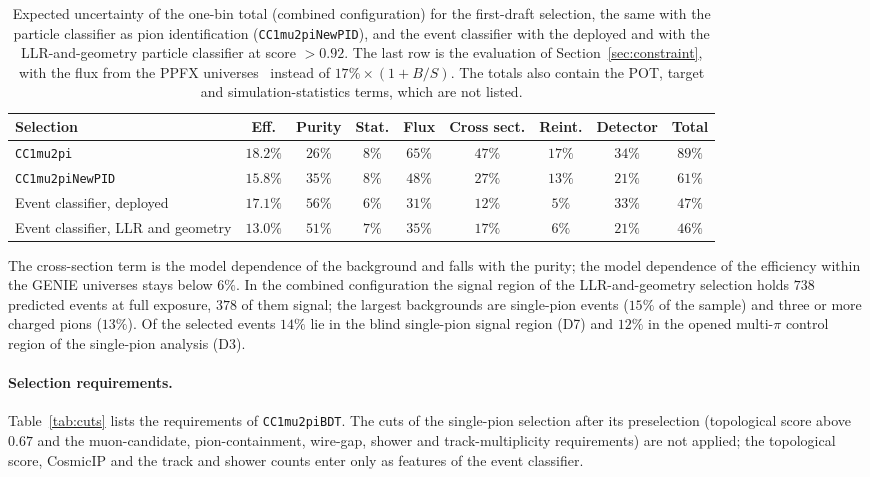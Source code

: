 \documentclass[11pt,a4paper]{article}
\begin{document}
\begin{table}[H]
  \centering
  \caption{Expected uncertainty of the one-bin total (combined configuration) for the first-draft
    selection, the same with the particle classifier as pion identification
    (\texttt{CC1mu2piNewPID}), and the event classifier with the deployed and with the
    LLR-and-geometry particle classifier at score $>0.92$. The last row is the evaluation of
    Section~\ref{sec:constraint}, with the flux from the PPFX universes~\cite{ppfx} instead of
    $17\%\times(1+B/S)$. The totals also contain the POT, target and simulation-statistics terms, which are not
    listed.}
  \label{tab:wp}
  \footnotesize\setlength{\tabcolsep}{4pt}
  \begin{tabular}{lcccccccc}
    \toprule
    Selection & Eff. & Purity & Stat. & Flux & Cross sect. & Reint. & Detector & Total \\
    \midrule
    \texttt{CC1mu2pi}                     & $18.2\%$ & $26\%$ & $8\%$ & $65\%$ & $47\%$ & $17\%$ & $34\%$ & $89\%$ \\
    \texttt{CC1mu2piNewPID}               & $15.8\%$ & $35\%$ & $8\%$ & $48\%$ & $27\%$ & $13\%$ & $21\%$ & $61\%$ \\
    Event classifier, deployed            & $17.1\%$ & $56\%$ & $6\%$ & $31\%$ & $12\%$ & $5\%$  & $33\%$ & $47\%$ \\
    Event classifier, LLR and geometry    & $13.0\%$ & $51\%$ & $7\%$ & $35\%$ & $17\%$ & $6\%$  & $21\%$ & $46\%$ \\
    \bottomrule
  \end{tabular}
\end{table}

The cross-section term is the model dependence of the background and falls with the purity; the model
dependence of the efficiency within the GENIE universes stays below $6\%$. In the combined configuration the signal region of the
LLR-and-geometry selection holds $738$ predicted events at full exposure, $378$ of them signal; the largest backgrounds are
single-pion events ($15\%$ of the sample) and three or more charged pions ($13\%$). Of the selected
events $14\%$ lie in the blind single-pion signal region (D7) and $12\%$ in the opened multi-$\pi$
control region of the single-pion analysis (D3).

\paragraph{Selection requirements.} Table~\ref{tab:cuts} lists the requirements of
\texttt{CC1mu2piBDT}. The cuts of the single-pion selection after its preselection (topological score
above $0.67$ and the muon-candidate, pion-containment, wire-gap, shower and track-multiplicity
requirements) are not applied; the topological score, CosmicIP and the track and shower counts enter
only as features of the event classifier.
\end{document}
